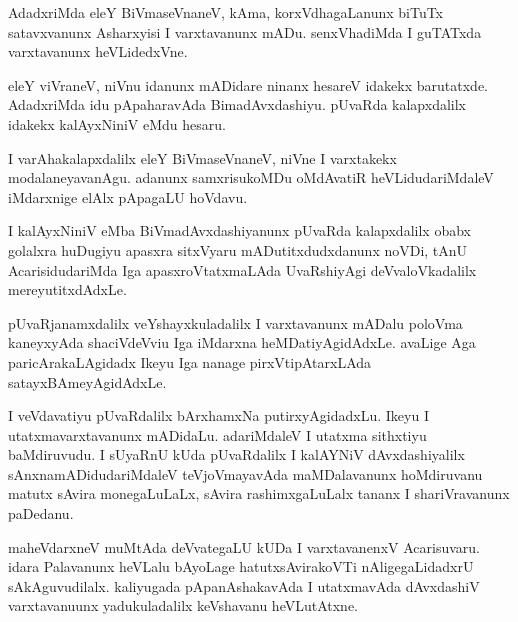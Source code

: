 \documentclass{article}
\begin{document}
\begin{mn}
AdadxriMda  eleY  BiVmaseVnaneV, kAma,  korxVdhagaLanunx  biTuTx  satavxvanunx  Asharxyisi  
I  varxtavanunx  mADu.  senxVhadiMda  I  guTATxda  varxtavanunx  heVLidedxVne.  
\end{mn}

\begin{mn}
eleY  viVraneV,  niVnu  idanunx  mADidare  ninanx  hesareV  idakekx  barutatxde.  AdadxriMda  
idu  pApaharavAda  BimadAvxdashiyu.  pUvaRda  kalapxdalilx  idakekx  kalAyxNiniV  eMdu  hesaru.
\end{mn}

\begin{mn}
I  varAhakalapxdalilx  eleY  BiVmaseVnaneV,  niVne  I  varxtakekx  modalaneyavanAgu.  adanunx  
samxrisukoMDu  oMdAvatiR  heVLidudariMdaleV  iMdarxnige  elAlx  pApagaLU  hoVdavu.
\end{mn}

\begin{mn}
I  kalAyxNiniV  eMba  BiVmadAvxdashiyanunx  pUvaRda  kalapxdalilx  obabx  golalxra  huDugiyu  
apasxra  sitxVyaru  mADutitxdudxdanunx  noVDi,  tAnU  AcarisidudariMda  Iga  apasxroVtatxmaLAda  
UvaRshiyAgi  deVvaloVkadalilx  mereyutitxdAdxLe.
\end{mn}

\begin{mn}
pUvaRjanamxdalilx  veYshayxkuladalilx  I  varxtavanunx  mADalu  poloVma  kaneyxyAda  shaciVdeVviu  
Iga  iMdarxna  heMDatiyAgidAdxLe.  avaLige  Aga  paricArakaLAgidadx  Ikeyu  Iga  nanage  
pirxVtipAtarxLAda  satayxBAmeyAgidAdxLe.
\end{mn}

\begin{mn}
I  veVdavatiyu  pUvaRdalilx  bArxhamxNa  putirxyAgidadxLu.  Ikeyu  I  utatxmavarxtavanunx  
mADidaLu.  adariMdaleV  I  utatxma  sithxtiyu  baMdiruvudu.  I  sUyaRnU  kUda  pUvaRdalilx  
I  kalAYNiV  dAvxdashiyalilx  sAnxnamADidudariMdaleV  teVjoVmayavAda  maMDalavanunx  hoMdiruvanu  
matutx  sAvira  monegaLuLaLx,  sAvira  rashimxgaLuLalx  tananx  I  shariVravanunx  paDedanu.
\end{mn}

\begin{mn}
maheVdarxneV  muMtAda  deVvategaLU  kUDa  I  varxtavanenxV  Acarisuvaru.  idara  Palavanunx  
heVLalu  bAyoLage  hatutxsAvirakoVTi  nAligegaLidadxrU  sAkAguvudilalx.  kaliyugada  
pApanAshakavAda  I  utatxmavAda  dAvxdashiV  varxtavanuunx  yadukuladalilx  keVshavanu  heVLutAtxne.
\end{mn}
\end{document}
